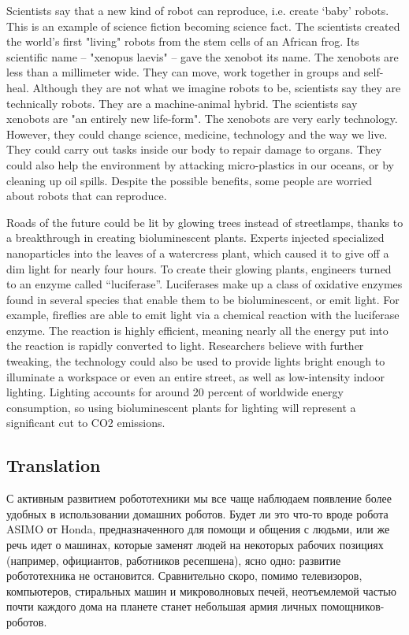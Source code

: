  Scientists say that a new kind of robot can reproduce, i.e. create ‘baby’ robots. This is an example of science fiction becoming science fact. The scientists created the world's first "living" robots from the stem cells of an African frog. Its scientific name – "xenopus laevis" – gave the xenobot its name. The xenobots are less than a millimeter wide. They can move, work together in groups and self-heal. Although they are not what we imagine robots to be, scientists say they are technically robots. They are a machine-animal hybrid. The scientists say xenobots are "an entirely new life-form". The xenobots are very early technology. However, they could change science, medicine, technology and the way we live. They could carry out tasks inside our body to repair damage to organs. They could also help the environment by attacking micro-plastics in our oceans, or by cleaning up oil spills. Despite the possible benefits, some people are worried about robots that can reproduce.

 Roads of the future could be lit by glowing trees instead of streetlamps, thanks to a breakthrough in creating bioluminescent plants. Experts injected specialized nanoparticles into the leaves of a watercress plant, which caused it to give off a dim light for nearly four hours. To create their glowing plants, engineers turned to an enzyme called “luciferase”. Luciferases make up a class of oxidative enzymes found in several species that enable them to be bioluminescent, or emit light. For example, fireflies are able to emit light via a chemical reaction with the luciferase enzyme. The reaction is highly efficient, meaning nearly all the energy put into the reaction is rapidly converted to light. Researchers believe with further tweaking, the technology could also be used to provide lights bright enough to illuminate a workspace or even an entire street, as well as low-intensity indoor lighting. Lighting accounts for around 20 percent of worldwide energy consumption, so using bioluminescent plants for lighting will represent a significant cut to CO2 emissions.


\subsection*{Translation}
 С активным развитием робототехники мы все чаще наблюдаем появление более удобных в использовании домашних роботов. Будет ли это что-то вроде робота ASIMO от Honda, предназначенного для помощи и общения с людьми, или же речь идет о машинах, которые заменят людей на некоторых рабочих позициях (например, официантов, работников ресепшена), ясно одно: развитие робототехника не остановится. Сравнительно скоро, помимо телевизоров, компьютеров, стиральных машин и микроволновых печей, неотъемлемой частью почти каждого дома на планете станет небольшая армия личных помощников-роботов.


